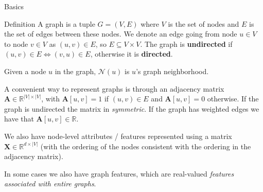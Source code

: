 \documentclass[10pt, aspectratio=169, compress, protectframetitle, handout]{beamer}
\begin{document}
\begin{frame}{Basics}
    
    \begin{block}{Definition}
        A \alert{graph} is a tuple $G = (V, E)$ where $V$ is the set of nodes and $E$ is the set of edges between these nodes. We denote an edge going from node $u \in V$ to node $v \in V$ as $(u, v) \in E$, so $E \subseteq V \times V$. The graph is \textbf{undirected} if $(u, v) \in E \Longleftrightarrow  (v, u) \in E$, otherwise it is \textbf{directed}.
    \end{block}
    
    Given a node $u$ in the graph, $\mathcal N(u)$ is $u$'s graph neighborhood.
    
    A convenient way to represent graphs is through an \alert{adjacency matrix} $\mathbf A \in \mathbb R^{|V| \times |V|}$, with $\mathbf A[u, v] = 1$ if $(u, v) \in E$ and $\mathbf A[u, v] = 0$ otherwise. If the graph is undirected the matrix in \emph{symmetric}. If the graph has weighted edges we have that $\mathbf A[u,v] \in \mathbb R$.
    
    We also have \alert{node-level attributes / features} represented using a matrix $\mathbf X \in \mathbb R^{d \times |V|}$ (with the ordering of the nodes consistent with the ordering in the adjacency matrix).
    
    In some cases we also have \alert{graph features}, which are real-valued \emph{features associated with entire graphs}.
    
\end{frame}
\end{document}
